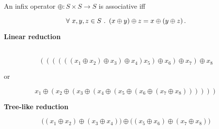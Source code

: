\begin{frame}[plain]

\begin{center}
An infix operator $\oplus : S \times S \rightarrow S$ is associative iff
\end{center}

\[\forall\ x,y,z\in S\ .\ \left({x \oplus y}\right) \oplus z = x \oplus \left({y \oplus z}\right).\]

\end{frame}

\begin{frame}[plain]

\textbf{Linear reduction}

\ \\

\[\left(\left(\left(\left(\left(\left(x_1\oplus x_2\right) \oplus x_3 \right)
\oplus x_4 \right) x_5 \right) \oplus x_6 \right) \oplus x_7 \right) \oplus
x_8\]

\begin{center}
or
\end{center}

\[x_1 \oplus \left(x_2 \oplus \left(x_3 \oplus \left( x_4 \oplus \left( x_5
\oplus \left( x_6 \oplus \left(x_7\oplus x_8\right) \right) \right) \right)
\right) \right)\]

\end{frame}

\begin{frame}[plain]

\textbf{Tree-like reduction}

\[\big( \left(x_1 \oplus x_2\right) \oplus \left(x_3 \oplus x_4\right) \big)
\oplus \big( \left(x_5 \oplus x_6 \right) \oplus \left(x_7 \oplus x_8\right)
\big)\]

\end{frame}


